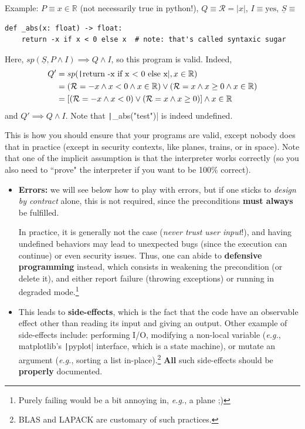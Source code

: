 \documentclass[10pt,
aspectratio=169
]{beamer}
\begin{document}
\begin{frame}[fragile]
	Example: $P \equiv x\in\mathbb{R}$ (not necessarily true in python!), $Q\equiv \mathcal{R} = |x|$, $I \equiv \text{yes}$, $\underline{S} \equiv$\begin{verbatim}
def _abs(x: float) -> float:
	return -x if x < 0 else x  # note: that's called syntaxic sugar
	\end{verbatim}
	Here, $sp(\underline{S}, P \land I) \implies Q \land I$, so this program is valid. Indeed, \begin{align*}
		Q' &= sp(\text{\texttt|return -x if x < 0 else x|}, x\in\mathbb{R}) \\
		&= (\mathcal{R} = -x \land x < 0 \land x\in\mathbb{R}) \lor (\mathcal{R} = x \land x \geq 0 \land x\in\mathbb{R})\\
		&= [(\mathcal{R} = -x \land x < 0) \lor (\mathcal{R} = x \land x \geq 0)]  \land x\in\mathbb{R}
	\end{align*}
	and $Q' \implies Q \land I$. Note that \texttt|_abs("test")| is indeed undefined.
	
	This is how you should ensure that your programs are valid, except nobody does that in practice (except in security contexts, like planes, trains, or in space). Note that one of the implicit assumption is that the interpreter works correctly (so you also need to ``prove" the interpreter if you want to be 100\% correct).
\end{frame}

\begin{frame}
	\begin{itemize}
		\item \textbf{Errors:} we will see below how to play with errors, but if one sticks to \textit{design by contract} alone, this is not required, since the preconditions \textbf{must always} be fulfilled. 
		
		In practice, it is generally not the case (\textit{never trust user input}!), and having undefined behaviors may lead to unexpected bugs (since the execution can continue) or even security issues. Thus, one can abide to \textbf{defensive programming} instead, which consists in weakening the precondition (or delete it), and either report failure (throwing exceptions) or running in degraded mode.\footnote{Purely failing would be a bit annoying in, \textit{e.g.}, a plane ;)}
		 \item This leads to \textbf{side-effects}, which is the fact that the code have an observable effect other than reading its input and giving an output. Other example of side-effects include: performing I/O, modifying a non-local variable (\textit{e.g.}, matplotlib's \texttt|pyplot| interface, which is a state machine), or mutate an argument (\textit{e.g.}, sorting a list in-place).\footnote{BLAS and LAPACK are customary of such practices.} \textbf{All} such side-effects should be \textbf{properly} documented.
	\end{itemize}
\end{frame}
\end{document}
